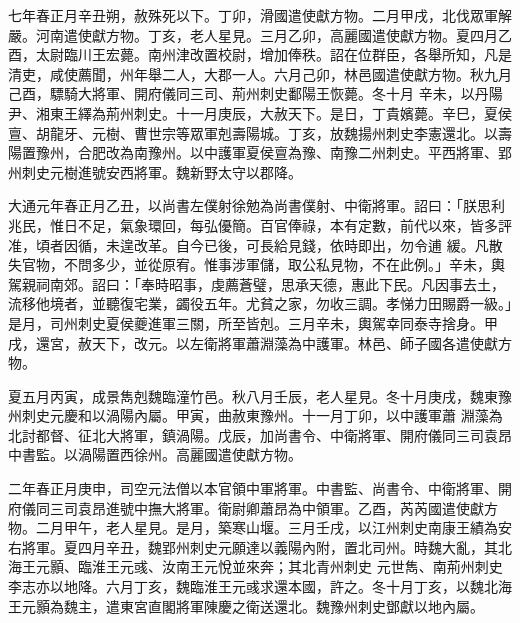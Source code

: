 \begin{pinyinscope}
 七年春正月辛丑朔，赦殊死以下。丁卯，滑國遣使獻方物。二月甲戌，北伐眾軍解嚴。河南遣使獻方物。丁亥，老人星見。三月乙卯，高麗國遣使獻方物。夏四月乙酉，太尉臨川王宏薨。南州津改置校尉，增加俸秩。詔在位群臣，各舉所知，凡是清吏，咸使薦聞，州年舉二人，大郡一人。六月己卯，林邑國遣使獻方物。秋九月己酉，驃騎大將軍、開府儀同三司、荊州刺史鄱陽王恢薨。冬十月
 辛未，以丹陽尹、湘東王繹為荊州刺史。十一月庚辰，大赦天下。是日，丁貴嬪薨。辛巳，夏侯亶、胡龍牙、元樹、曹世宗等眾軍剋壽陽城。丁亥，放魏揚州刺史李憲還北。以壽陽置豫州，合肥改為南豫州。以中護軍夏侯亶為豫、南豫二州刺史。平西將軍、郢州刺史元樹進號安西將軍。魏新野太守以郡降。



 大通元年春正月乙丑，以尚書左僕射徐勉為尚書僕射、中衛將軍。詔曰：「朕思利兆民，惟日不足，氣象環回，每弘優簡。百官俸祿，本有定數，前代以來，皆多評准，頃者因循，未遑改革。自今已後，可長給見錢，依時即出，勿令逋
 緩。凡散失官物，不問多少，並從原宥。惟事涉軍儲，取公私見物，不在此例。」辛未，輿駕親祠南郊。詔曰：「奉時昭事，虔薦蒼璧，思承天德，惠此下民。凡因事去土，流移他境者，並聽復宅業，蠲役五年。尤貧之家，勿收三調。孝悌力田賜爵一級。」是月，司州刺史夏侯夔進軍三關，所至皆剋。三月辛未，輿駕幸同泰寺捨身。甲戌，還宮，赦天下，改元。以左衛將軍蕭淵藻為中護軍。林邑、師子國各遣使獻方物。



 夏五月丙寅，成景雋剋魏臨潼竹邑。秋八月壬辰，老人星見。冬十月庚戌，魏東豫州刺史元慶和以渦陽內屬。甲寅，曲赦東豫州。十一月丁卯，以中護軍蕭
 淵藻為北討都督、征北大將軍，鎮渦陽。戊辰，加尚書令、中衛將軍、開府儀同三司袁昂中書監。以渦陽置西徐州。高麗國遣使獻方物。



 二年春正月庚申，司空元法僧以本官領中軍將軍。中書監、尚書令、中衛將軍、開府儀同三司袁昂進號中撫大將軍。衛尉卿蕭昂為中領軍。乙酉，芮芮國遣使獻方物。二月甲午，老人星見。是月，築寒山堰。三月壬戌，以江州刺史南康王績為安右將軍。夏四月辛丑，魏郢州刺史元願達以義陽內附，置北司州。時魏大亂，其北海王元顥、臨淮王元彧、汝南王元悅並來奔；其北青州刺史
 元世雋、南荊州刺史李志亦以地降。六月丁亥，魏臨淮王元彧求還本國，許之。冬十月丁亥，以魏北海王元顥為魏主，遣東宮直閣將軍陳慶之衛送還北。魏豫州刺史鄧獻以地內屬。




\end{pinyinscope}
